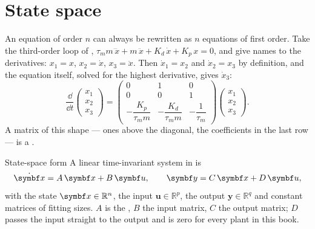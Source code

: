 \section{State space}

An equation of order $n$ can always be rewritten as $n$ equations of first order. Take the third-order loop of , $\tau_m m\,\dddot x + m\,\ddot x + K_d\,\dot x + K_p\,x = 0$, and give names to the derivatives: $x_1 = x$, $x_2 = \dot x$, $x_3 = \ddot x$. Then $\dot x_1 = x_2$ and $\dot x_2 = x_3$ by definition, and the equation itself, solved for the highest derivative, gives $\dot x_3$:
\begin{equation}\label{eq:A-companion}
  \frac{\dd}{\dd t}\begin{pmatrix} x_1\\ x_2\\ x_3\end{pmatrix}
  = \begin{pmatrix} 0 & 1 & 0\\ 0 & 0 & 1\\ -\dfrac{K_p}{\tau_m m} & -\dfrac{K_d}{\tau_m m} & -\dfrac{1}{\tau_m}\end{pmatrix}
  \begin{pmatrix} x_1\\ x_2\\ x_3\end{pmatrix} .
\end{equation}
A matrix of this shape — ones above the diagonal, the coefficients in the last row — is a .

\begin{definition}{State-space form}
A linear time-invariant system in  is
\begin{equation}\label{eq:A-ss}
  \dot{\vx} = A\,\vx + B\,\symbf u, \qquad \symbf y = C\,\vx + D\,\symbf u ,
\end{equation}
with the state $\vx \in \mathbb{R}^n$, the input $\symbf u \in \mathbb{R}^p$, the output $\symbf y \in \mathbb{R}^q$ and constant matrices of fitting sizes. $A$ is the , $B$ the input matrix, $C$ the output matrix; $D$ passes the input straight to the output and is zero for every plant in this book.
\end{definition}

